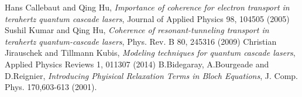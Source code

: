 \documentclass[10pt,english,fleqn]{article}%
\begin{document}
\begin{thebibliography}{1}
 Hans Callebaut and Qing Hu, \emph{Importance of coherence for electron transport in terahertz quantum cascade lasers}, Journal of Applied Physics 98, 104505 (2005)
 Sushil Kumar and Qing Hu, \emph{Coherence of resonant-tunneling transport in terahertz quantum-cascade lasers}, Phys. Rev. B 80, 245316 (2009)
 Christian Jirauschek and Tillmann Kubis, \emph{Modeling techniques for quantum cascade lasers}, Applied Physics Reviews 1, 011307 (2014)
 B.Bidegaray, A.Bourgeade and D.Reignier, \emph{Introducing Phyisical Relaxation Terms in Bloch Equations}, J. Comp. Phys. 170,603-613 (2001).
\end{thebibliography}
\end{document}
